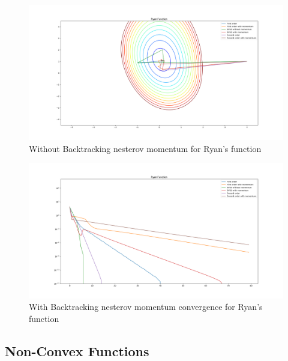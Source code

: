 \documentclass{article}
\begin{document}
\begin{figure}[H]
	\includegraphics[width=\linewidth]{../Images/ryanbacktrack.png}
	\caption{Without Backtracking nesterov momentum for Ryan's function}
	\label{fig:With Backtracking nesterov momentum for Ryan's function}
\end{figure}

\begin{figure}[H]
	\includegraphics[width=\linewidth]{../Images/ryanbacktrack1.png}
	\caption{With Backtracking nesterov momentum convergence for Ryan's function}
	\label{fig:With Backtracking nesterov momentum convergence for Ryan's function}
\end{figure}
		
\subsection{Non-Convex Functions}
\end{document}

